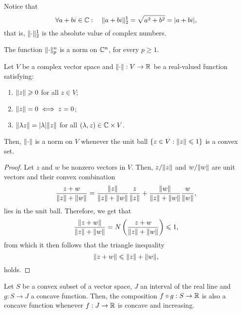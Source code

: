 Notice that
\[
  \forall{a+bi\in\complexfield}:\quad{\norm<1>[2](a+bi)=\sqrt{a^{2}+b^{2}}=\abs{a+bi}},
\]
that is, \(\norm<1>[2]\) is the absolute value of complex numbers.

\begin{proposition}\label{proposition:the-p-norm-is-in-fact-a-norm}
  The function \(\norm<n>[p]\) is a norm on \(\mathbb{C}^{n}\), for every
  \(p\geqslant{1}\).
\end{proposition}

\begin{lemma}\label{lemma:on-norms-and-the-convexity-of-the-unitary-closed-ball}
  Let \(V\) be a complex vector space and \(\norm:V\to\reals\) be a real-valued
  function satisfying:
  \begin{enumerate}
    \item
      \(\norm(z)\geqslant{0}\) for all \(z\in{V}\);
    \item
      \(\norm(z)=0\iff{z=0}\);
    \item
      \(\norm(\lambda{z})=\abs{\lambda}\norm(z)\) for all
      \((\lambda,z)\in\mathbb{C}\times{V}\).
  \end{enumerate}
  Then, \(\norm\) is a norm on \(V\) whenever the unit ball
  \(\left\{z\in{V}:\norm(z)\leqslant{1}\right\}\) is a convex set.
\end{lemma}

\begin{proof}
  Let \(z\) and \(w\) be nonzero vectors in \(V\). Then, \(z/\norm(z)\) and
  \(w/\norm(w)\) are unit vectors and their convex combination
  \[
    \frac{z+w}{\norm(z)+\norm(w)}
    =
    \frac{\norm(z)}{\norm(z)+\norm(w)}\frac{z}{\norm(z)}
    +
    \frac{\norm(w)}{\norm(z)+\norm(w)}\frac{w}{\norm(w)}
    ,
  \]
  lies in the unit ball. Therefore, we get that
  \[
    \frac{\norm(z+w)}{\norm(z)+\norm(w)}
    =
    N\left(\frac{z+w}{\norm(z)+\norm(w)}\right)\leqslant{1},
  \]
  from which it then follows that the triangle inequality
  \[
    \norm(z+w)\leqslant{\norm(z)+\norm(w)},
  \]
  holds.
\end{proof}

\begin{lemma}\label{lemma:concavity-of-compositions-of-concave-functions}
  Let \(S\) be a convex subset of a vector space, \(J\) an interval of the real
  line and \(g:S\to{J}\) a concave function. Then, the composition
  \(f\circ{g}:S\to\mathbb{R}\) is also a concave function whenever \(f:J\to\mathbb{R}\)
  is concave and increasing.
\end{lemma}

